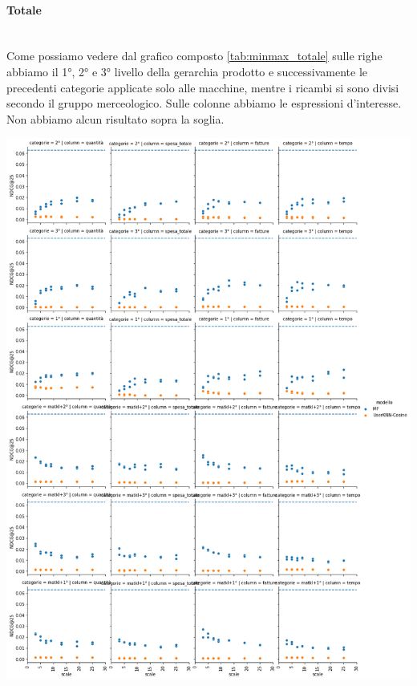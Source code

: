 \paragraph{Totale}\mbox{} \\
Come possiamo vedere dal grafico composto \ref{tab:minmax_totale} sulle righe abbiamo il 1°, 2° e 3° livello della gerarchia prodotto e successivamente le precedenti categorie applicate solo alle macchine, mentre i ricambi si sono divisi secondo il gruppo merceologico. Sulle colonne abbiamo le espressioni d'interesse. Non abbiamo alcun risultato sopra la soglia.
\begin{center}
\includegraphics[width=14.5cm]{figures/risultati_minmax_categoria_totale.png}
\label{tab:minmax_totale}
\end{center}

